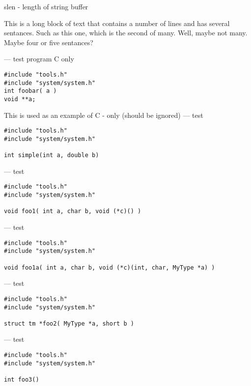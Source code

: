 slen - length of string buffer
\par
{}
This is a long block of text that contains a number of lines
and has several sentances.  Such as this one, which is the
second of many.  Well, maybe not many.  Maybe four or
five sentances?
\par
{}
\endmanpage
\startmanpage
{}
--- test program C only 
\startvb\begin{verbatim}
#include "tools.h"
#include "system/system.h"
int foobar( a )
void **a;
\end{verbatim}
\endvb
This is used as an example of C - only (should be ignored)
\endmanpage
\startmanpage
{}
--- test 
\startvb\begin{verbatim}
#include "tools.h"
#include "system/system.h"

int simple(int a, double b)
\end{verbatim}
\endvb

\endmanpage
\startmanpage
{}
--- test  
\startvb\begin{verbatim}
#include "tools.h"
#include "system/system.h"

void foo1( int a, char b, void (*c)() )
\end{verbatim}
\endvb

\endmanpage
\startmanpage
{}
--- test  
\startvb\begin{verbatim}
#include "tools.h"
#include "system/system.h"

void foo1a( int a, char b, void (*c)(int, char, MyType *a) )
\end{verbatim}
\endvb

\endmanpage
\startmanpage
{}
--- test  
\startvb\begin{verbatim}
#include "tools.h"
#include "system/system.h"

struct tm *foo2( MyType *a, short b )
\end{verbatim}
\endvb

\endmanpage
\startmanpage
{}
--- test 
\startvb\begin{verbatim}
#include "tools.h"
#include "system/system.h"

int foo3()
\end{verbatim}
\endvb

